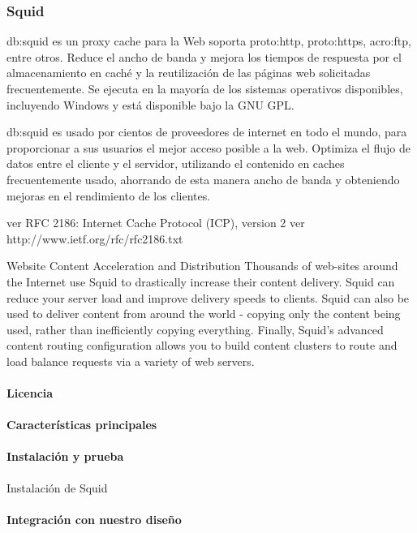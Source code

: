 \subsubsection{Squid}
\label{soa:tecnologias:squid}

\gls{db:squid} es un proxy cache para la Web soporta \gls{proto:http}, \gls{proto:https}, \gls{acro:ftp}, entre otros. Reduce el ancho de banda y mejora los tiempos de respuesta por el almacenamiento en caché y la reutilización de las páginas web solicitadas frecuentemente.  Se ejecuta en la mayoría de los sistemas operativos disponibles, incluyendo Windows y está disponible bajo la GNU GPL.

\gls{db:squid} es usado por cientos de proveedores de internet en todo el mundo, para proporcionar a sus usuarios el mejor acceso posible a la web.  Optimiza el flujo de datos entre el cliente y el servidor, utilizando el contenido en caches frecuentemente usado, ahorrando de esta manera ancho de banda y obteniendo mejoras en el rendimiento de los clientes.

ver RFC 2186: Internet Cache Protocol (ICP), version 2
ver http://www.ietf.org/rfc/rfc2186.txt

Website Content Acceleration and Distribution
Thousands of web-sites around the Internet use Squid to drastically increase their content delivery. Squid can reduce your server load and improve delivery speeds to clients. Squid can also be used to deliver content from around the world - copying only the content being used, rather than inefficiently copying everything. Finally, Squid's advanced content routing configuration allows you to build content clusters to route and load balance requests via a variety of web servers.

\paragraph{Licencia}

\paragraph{Características principales}

\paragraph{Instalación y prueba}

\begin{listing}[H]
  \caption{Instalación de Squid}
  \label{soa:tecnologias:squid-cache:bash-preparacion}
\end{listing}

\paragraph{Integración con nuestro diseño}
